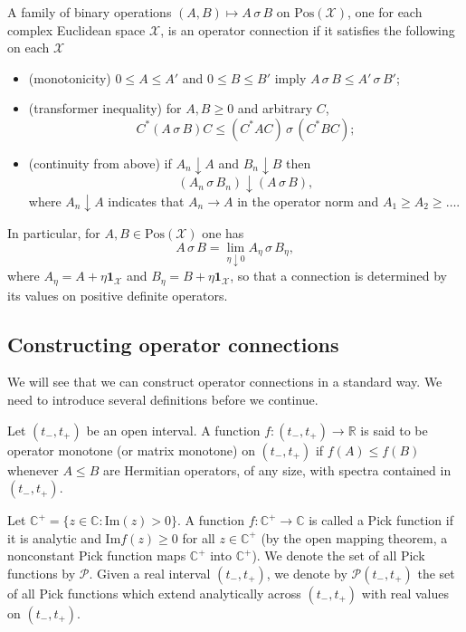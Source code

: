\begin{definition}
A family of binary operations $(A,B)\mapsto A\,\sigma\,B$ on $\mathrm{Pos}(\mathcal{X})$, one for each complex Euclidean space $\mathcal{X}$, is an operator connection if it satisfies the following on each $\mathcal{X}$
\begin{itemize}
    \item (monotonicity) $0\leq A\leq A'$ and $0\leq B\leq B'$ imply $A\,\sigma\,B\leq A'\,\sigma\,B'$;
    \item (transformer inequality) for $A,B\geq 0$ and arbitrary $C$,
    \[
        C^*(A\,\sigma\,B)C\leq (C^*AC)\,\sigma\,(C^*BC);
    \]
    \item (continuity from above) if $A_n\downarrow A$ and $B_n\downarrow B$ then 
    \[
        (A_n\,\sigma\,B_n)\downarrow (A\,\sigma\,B),
    \] where $A_n\downarrow A$ indicates that 
    $A_n\to A$ in the operator norm and $A_1\geq A_2\geq \dots$.
\end{itemize}
In particular, for $A,B \in \mathrm{Pos}(\mathcal{X})$ one has
\[
    A\,\sigma\,B=\lim_{\eta\downarrow0}A_\eta\,\sigma\,B_\eta,
\]
where $A_\eta= A+\eta \mathbf{1}_{\mathcal{X}}$ and $B_\eta=B+\eta \mathbf{1}_{\mathcal{X}}$, so that a connection is determined by its values on positive definite operators.
\end{definition}
\subsection{Constructing operator connections}
We will see that we can construct operator connections in a standard way. We need to introduce several definitions before we continue. 
 
\begin{definition}
Let $(t_-,t_+)$ be an open interval. A function $f:(t_-,t_+)\to \mathbb{R}$ is said to be operator monotone (or matrix monotone) on $(t_-,t_+)$ if $f(A)\leq f(B)$ whenever $A\leq B$ are Hermitian operators, of any size, with spectra contained in $(t_-,t_+)$. 
\end{definition}
 
\begin{definition}
    Let $\mathbb{C}^+=\{z\in \mathbb{C}: \mathrm{Im}(z)>0\}$. A function $f:\mathbb{C}^+\to \mathbb{C}$ is called a Pick function if it is analytic and $\mathrm{Im}f(z)\geq 0$ for all $z\in\mathbb{C}^+$ (by the open mapping theorem, a nonconstant Pick function maps $\mathbb{C}^+$ into $\mathbb{C}^+$). We denote the set of all Pick functions by $\mathcal{P}$. Given a real interval $(t_-,t_+)$, we denote by $\mathcal{P}(t_-,t_+)$ the set of all Pick functions which extend analytically across $(t_-,t_+)$ with real values on $(t_-,t_+)$.
\end{definition}
 
